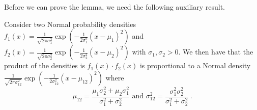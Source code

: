 \documentclass{article}
\begin{document}
Before we can prove the lemma, we need the following auxiliary result.

\begin{lemma} \label{lem:gaussian_products}
    Consider two Normal probability densities $f_1(x) = \frac{1}{\sqrt{2\pi\sigma_1^2}} \exp \left( -\frac{1}{2\sigma_1^2} \left( x - \mu_1\right)^2 \right)$ and $f_2(x) = \frac{1}{\sqrt{2\pi\sigma_2^2}} \exp \left( -\frac{1}{2\sigma_2^2} \left( x - \mu_2\right)^2 \right)$ with $\sigma_1,\sigma_2>0$. We then have that the product of the densities is $f_1(x) \cdot f_2(x)$  is proportional to a Normal density $\frac{1}{\sqrt{2\pi\sigma_{12}^2}} \exp \left( -\frac{1}{2\sigma_{12}^2} \left( x - \mu_{12}\right)^2 \right)$ where
    \begin{equation*}
        \mu_{12} = \frac{\mu_{1}\sigma_2^2 + \mu_2\sigma_1^2}{\sigma_1^2 + \sigma_2^2} \text{  and  } \sigma_{12}^2 = \frac{\sigma_1^2 \sigma_2^2}{\sigma_1^2 + \sigma_2^2}~.
    \end{equation*}
\end{lemma}
\end{document}
